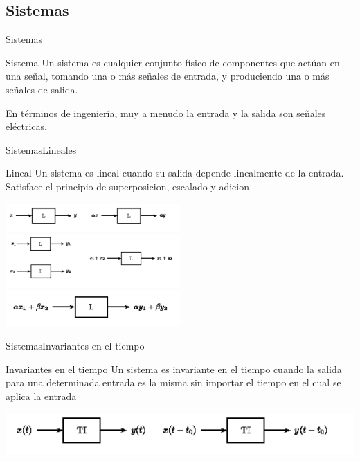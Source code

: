 \begin{darkframes}
   \subsection{Sistemas}
   \begin{frame}{Sistemas}
      \begin{block}{Sistema}
         Un sistema es cualquier conjunto físico de componentes que actúan en una señal, tomando una o más señales de entrada, y produciendo una o más señales de salida.
      \end{block}
         En términos de ingeniería, muy a menudo la entrada y la salida son señales eléctricas.
      \vfill
   \end{frame}
   \begin{frame}{Sistemas}{Lineales}
      \begin{block}{Lineal}
         Un sistema es lineal cuando su salida depende linealmente de la entrada.
         Satisface el principio de superposicion, escalado y adicion
      \end{block}
      \center\includegraphics[width=0.5\textwidth]{1_clase/superposicion1}
      \center\includegraphics[width=0.5\textwidth]{1_clase/superposicion2}
      \center\includegraphics[width=0.5\textwidth]{1_clase/superposicion3}
      \vfill
   \end{frame}
   \begin{frame}{Sistemas}{Invariantes en el tiempo}
      \begin{block}{Invariantes en el tiempo}
         Un sistema es invariante en el tiempo cuando la salida para una determinada entrada es la misma sin importar el tiempo en el cual se aplica la entrada
      \end{block}
      \center\includegraphics[width=1\textwidth]{1_clase/invariante_en_tiempo}

\end{frame}
\end{darkframes}
